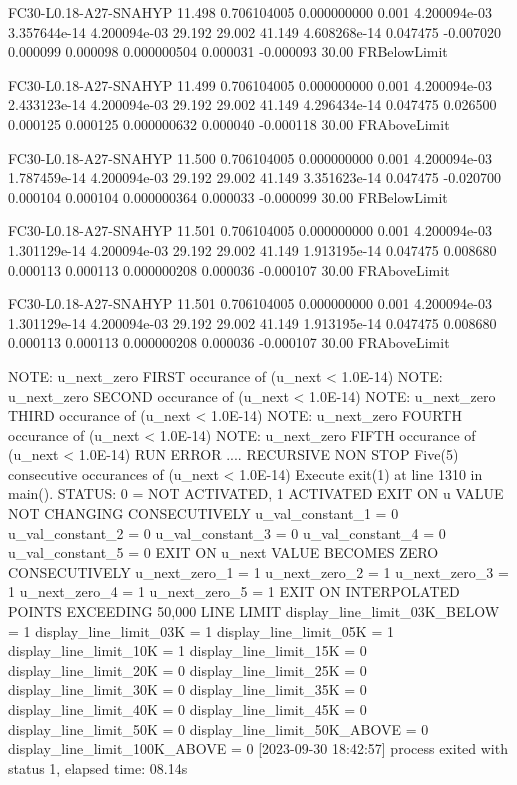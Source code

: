 FC30-L0.18-A27-SNAHYP  11.498  0.706104005  0.000000000  0.001 4.200094e-03  3.357644e-14  4.200094e-03   29.192  29.002  41.149  4.608268e-14   0.047475  -0.007020   0.000099   0.000098  0.000000504   0.000031  -0.000093  30.00 FRBelowLimit 

FC30-L0.18-A27-SNAHYP  11.499  0.706104005  0.000000000  0.001 4.200094e-03  2.433123e-14  4.200094e-03   29.192  29.002  41.149  4.296434e-14   0.047475   0.026500   0.000125   0.000125  0.000000632   0.000040  -0.000118  30.00 FRAboveLimit 

FC30-L0.18-A27-SNAHYP  11.500  0.706104005  0.000000000  0.001 4.200094e-03  1.787459e-14  4.200094e-03   29.192  29.002  41.149  3.351623e-14   0.047475  -0.020700   0.000104   0.000104  0.000000364   0.000033  -0.000099  30.00 FRBelowLimit 

FC30-L0.18-A27-SNAHYP  11.501  0.706104005  0.000000000  0.001 4.200094e-03  1.301129e-14  4.200094e-03   29.192  29.002  41.149  1.913195e-14   0.047475   0.008680   0.000113   0.000113  0.000000208   0.000036  -0.000107  30.00 FRAboveLimit 

FC30-L0.18-A27-SNAHYP  11.501  0.706104005  0.000000000  0.001 4.200094e-03  1.301129e-14  4.200094e-03   29.192  29.002  41.149  1.913195e-14   0.047475   0.008680   0.000113   0.000113  0.000000208   0.000036  -0.000107  30.00 FRAboveLimit 

 NOTE: u_next_zero FIRST  occurance of (u_next < 1.0E-14)
 NOTE: u_next_zero SECOND occurance of (u_next < 1.0E-14)
 NOTE: u_next_zero THIRD  occurance of (u_next < 1.0E-14)
 NOTE: u_next_zero FOURTH occurance of (u_next < 1.0E-14)
 NOTE: u_next_zero FIFTH  occurance of (u_next < 1.0E-14)
 RUN ERROR .... RECURSIVE NON STOP 
 Five(5) consecutive occurances of (u_next < 1.0E-14) 
 Execute exit(1) at line 1310 in main(). 
 STATUS: 0 = NOT ACTIVATED, 1 ACTIVATED 
EXIT ON u VALUE NOT CHANGING CONSECUTIVELY
u_val_constant_1 = 0 
u_val_constant_2 = 0 
u_val_constant_3 = 0 
u_val_constant_4 = 0 
u_val_constant_5 = 0 
EXIT ON u_next VALUE BECOMES ZERO CONSECUTIVELY
u_next_zero_1 = 1 
u_next_zero_2 = 1 
u_next_zero_3 = 1 
u_next_zero_4 = 1 
u_next_zero_5 = 1 
EXIT ON INTERPOLATED POINTS EXCEEDING 50,000 LINE LIMIT
display_line_limit_03K_BELOW = 1 
display_line_limit_03K = 1 
display_line_limit_05K = 1 
display_line_limit_10K = 1 
display_line_limit_15K = 0 
display_line_limit_20K = 0 
display_line_limit_25K = 0 
display_line_limit_30K = 0 
display_line_limit_35K = 0 
display_line_limit_40K = 0 
display_line_limit_45K = 0 
display_line_limit_50K = 0 
display_line_limit_50K_ABOVE = 0 
display_line_limit_100K_ABOVE = 0 
[2023-09-30 18:42:57] process exited with status 1, elapsed time: 08.14s

